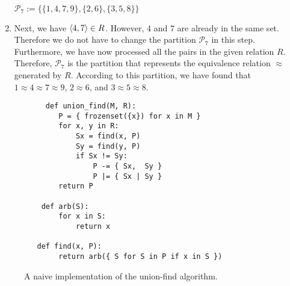 \begin{enumerate}
      \\[0.2cm]
      \hspace*{1.3cm}
      $\mathcal{P}_7 := \bigl\{ \{1, 4, 7, 9\}, \{2,6\}, \{3,5,8\} \bigr\}$
\item Next, we have $\pair(4,7) \in R$.  However, $4$ and $7$ are already in the same set.
      Therefore we do not have to change the partition $\mathcal{P}_7$ in this step.
      Furthermore, we have now processed all the pairs in the given relation $R$.
      Therefore, $\mathcal{P}_7$ is the partition that represents the equivalence relation $\approx$ generated
      by $R$.  According to this partition, we have found that
      \\[0.2cm]
      \hspace*{1.3cm}
      $1 \approx 4 \approx 7 \approx 9$, \quad $2 \approx 6$,  \quad and \quad $3 \approx 5 \approx 8$.
\end{enumerate}
 
\begin{figure}[!ht]
\centering
\begin{verbatim}
     def union_find(M, R):
        P = { frozenset({x}) for x in M } 
        for x, y in R:
            Sx = find(x, P)
            Sy = find(y, P)
            if Sx != Sy:
                P -= { Sx,  Sy }
                P |= { Sx | Sy }
        return P
    
    def arb(S):
        for x in S:
            return x
    
   def find(x, P):
        return arb({ S for S in P if x in S })    
\end{verbatim}
\vspace*{-0.3cm}
\caption{A naive implementation of the union-find algorithm.}
\label{fig:Union-Find-Naive.ipynb}
\end{figure}


